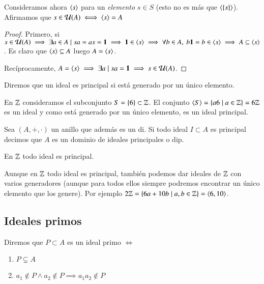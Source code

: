\begin{pro}
	Consideramos ahora $\langle s\rangle$ para un \textit{elemento} $s \in S$ (esto no es más que $\langle\{s\}\rangle$). Afirmamos que $s \in \mathcal{U}(A) \iff \langle s\rangle = A$
\end{pro}

\begin{proof}
	\label{pro:inunidadesiffgenerado}
	Primero, si $s \in \mathcal{U}(A) \implies \exists a \in A \mid sa = as = \mathbf{1} \implies \mathbf{1} \in \langle s\rangle \implies \forall b \in A,\ b\mathbf{1} = b \in \langle s\rangle \implies A \subseteq \langle s\rangle$. Es claro que $\langle s\rangle \subseteq A$ luego $A = \langle s\rangle$.
	
	Recíprocamente, $A = \langle s\rangle \implies \exists a \mid sa = \mathbf{1} \implies s \in \mathcal{U}(A)$.
\end{proof}

\begin{dfn}
	Diremos que un ideal es principal si está generado por un único elemento.
\end{dfn}

\begin{ej}
	En $\mathbb{Z}$ consideramos el subconjunto $S = \{6\} \subset \mathbb{Z}$. El conjunto $\langle S\rangle = \{a6 \mid a \in \mathbb{Z}\} = 6\mathbb{Z}$ es un ideal y como está generado por un único elemento, es un ideal principal.
\end{ej}

\begin{dfn}
	\label{dfn:dominioidealesprincipales}
	Sea $(A, +, \cdot)$ un anillo que además es un \gls{di}. Si todo ideal $I \subset A$ es principal decimos que $A$ es un dominio de ideales principales o \gls{dip}.
\end{dfn}

\begin{obs}
	En $\mathbb{Z}$ todo ideal es principal.
\end{obs}

\begin{ej}
	Aunque en $\mathbb{Z}$ todo ideal es principal, también podemos dar ideales de $\mathbb{Z}$ con varios generadores (aunque para todos ellos siempre podremos encontrar un único elemento que los genere). Por ejemplo $2\mathbb{Z} = \{6a+10b \mid a,b \in \mathbb{Z}\} = \langle6,10\rangle$.
\end{ej}

\subsection{Ideales primos}

\begin{dfn}
	Diremos que $P \subset A$ es un ideal primo $\iff$
	\begin{enumerate}
		\item $P \subsetneq A$
		\item $a_1 \notin P \land a_2 \notin P \implies a_1 a_2 \notin P$
	\end{enumerate}
\end{dfn}

